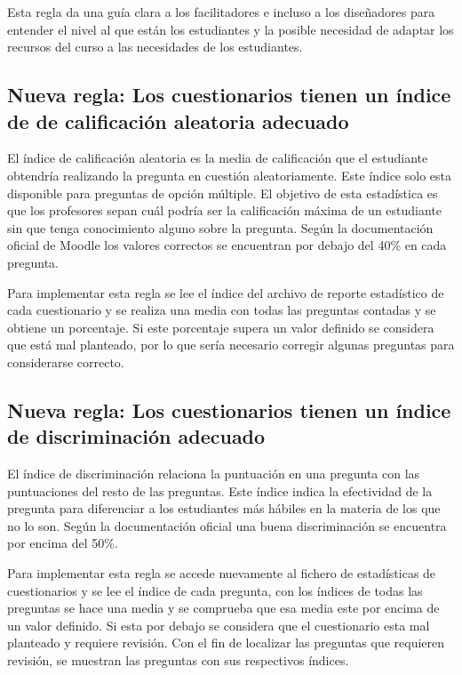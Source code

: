Esta regla da una guía clara a los facilitadores e incluso a los diseñadores para entender el nivel al que están los estudiantes y la posible necesidad de adaptar los recursos del curso a las necesidades de los estudiantes. 

\subsection{Nueva regla: Los cuestionarios tienen un índice de de calificación aleatoria adecuado}
El índice de calificación aleatoria es la media de calificación que el estudiante obtendría realizando la pregunta en cuestión aleatoriamente. Este índice solo esta disponible para preguntas de opción múltiple. El objetivo de esta estadística es que los profesores sepan cuál podría ser la calificación máxima de un estudiante sin que tenga conocimiento alguno sobre la pregunta. Según la documentación oficial de Moodle \cite{estadisticas-examen} los valores correctos se encuentran por debajo del 40\% en cada pregunta.

Para implementar esta regla se lee el índice del archivo de reporte estadístico de cada cuestionario y se realiza una media con todas las preguntas contadas y se obtiene un porcentaje. Si este porcentaje supera un valor definido se considera que está mal planteado, por lo que sería necesario corregir algunas preguntas para considerarse correcto.

\subsection{Nueva regla: Los cuestionarios tienen un índice de discriminación adecuado}
El índice de discriminación relaciona la puntuación en una pregunta con las puntuaciones del resto de las preguntas. Este índice indica la efectividad de la pregunta para diferenciar a los estudiantes más hábiles en la materia de los que no lo son. Según la documentación oficial \cite{estadisticas-examen} una buena discriminación se encuentra por encima del 50\%.

Para implementar esta regla se accede nuevamente al fichero de estadísticas de cuestionarios y se lee el índice de cada pregunta, con los índices de todas las preguntas se hace una media y se comprueba que esa media este por encima de un valor definido. Si esta por debajo se considera que el cuestionario esta mal planteado y requiere revisión. Con el fin de localizar las preguntas que requieren revisión, se muestran las preguntas con sus respectivos índices.

